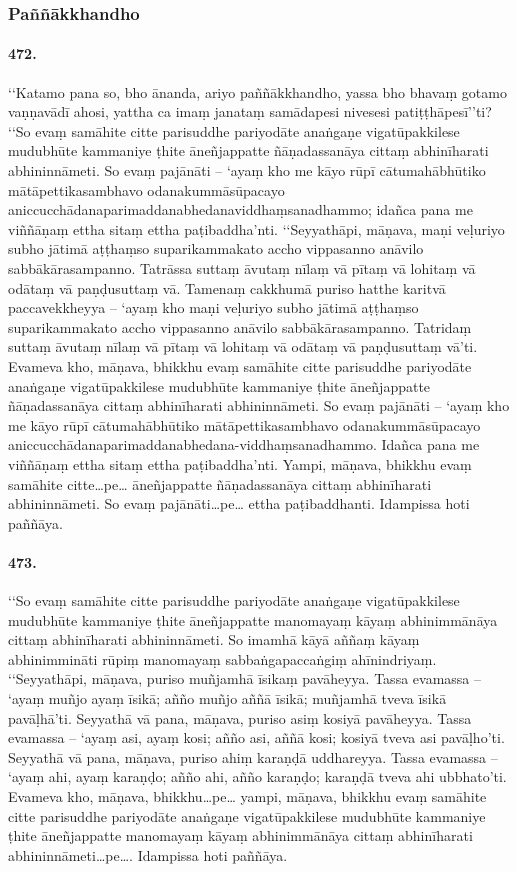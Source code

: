 \subsubsection{Paññākkhandho}

\paragraph{472.} ‘‘Katamo pana so, bho ānanda, ariyo paññākkhandho, yassa bho bhavaṃ gotamo vaṇṇavādī ahosi, yattha ca imaṃ janataṃ samādapesi nivesesi patiṭṭhāpesī’’ti? ‘‘So evaṃ samāhite citte parisuddhe pariyodāte anaṅgaṇe vigatūpakkilese mudubhūte kammaniye ṭhite āneñjappatte ñāṇadassanāya cittaṃ abhinīharati abhininnāmeti. So evaṃ pajānāti – ‘ayaṃ kho me kāyo rūpī cātumahābhūtiko mātāpettikasambhavo odanakummāsūpacayo aniccucchādanaparimaddanabhedanaviddhaṃsanadhammo; idañca pana me viññāṇaṃ ettha sitaṃ ettha paṭibaddha’nti. ‘‘Seyyathāpi, māṇava, maṇi veḷuriyo subho jātimā aṭṭhaṃso suparikammakato accho vippasanno anāvilo sabbākārasampanno. Tatrāssa suttaṃ āvutaṃ nīlaṃ vā pītaṃ vā lohitaṃ vā odātaṃ vā paṇḍusuttaṃ vā. Tamenaṃ cakkhumā puriso hatthe karitvā paccavekkheyya – ‘ayaṃ kho maṇi veḷuriyo subho jātimā aṭṭhaṃso suparikammakato accho vippasanno anāvilo sabbākārasampanno. Tatridaṃ suttaṃ āvutaṃ nīlaṃ vā pītaṃ vā lohitaṃ vā odātaṃ vā paṇḍusuttaṃ vā’ti. Evameva kho, māṇava, bhikkhu evaṃ samāhite citte parisuddhe pariyodāte anaṅgaṇe vigatūpakkilese mudubhūte kammaniye ṭhite āneñjappatte ñāṇadassanāya cittaṃ abhinīharati abhininnāmeti. So evaṃ pajānāti – ‘ayaṃ kho me kāyo rūpī cātumahābhūtiko mātāpettikasambhavo odanakummāsūpacayo aniccucchādanaparimaddanabhedana-viddhaṃsanadhammo. Idañca pana me viññāṇaṃ ettha sitaṃ ettha paṭibaddha’nti. Yampi, māṇava, bhikkhu evaṃ samāhite citte…pe… āneñjappatte ñāṇadassanāya cittaṃ abhinīharati abhininnāmeti. So evaṃ pajānāti…pe… ettha paṭibaddhanti. Idampissa hoti paññāya.

\paragraph{473.} ‘‘So evaṃ samāhite citte parisuddhe pariyodāte anaṅgaṇe vigatūpakkilese mudubhūte kammaniye ṭhite āneñjappatte manomayaṃ kāyaṃ abhinimmānāya cittaṃ abhinīharati abhininnāmeti. So imamhā kāyā aññaṃ kāyaṃ abhinimmināti rūpiṃ manomayaṃ sabbaṅgapaccaṅgiṃ ahīnindriyaṃ. ‘‘Seyyathāpi, māṇava, puriso muñjamhā īsikaṃ pavāheyya. Tassa evamassa – ‘ayaṃ muñjo ayaṃ īsikā; añño muñjo aññā īsikā; muñjamhā tveva īsikā pavāḷhā’ti. Seyyathā vā pana, māṇava, puriso asiṃ kosiyā pavāheyya. Tassa evamassa – ‘ayaṃ asi, ayaṃ kosi; añño asi, aññā kosi; kosiyā tveva asi pavāḷho’ti. Seyyathā vā pana, māṇava, puriso ahiṃ karaṇḍā uddhareyya. Tassa evamassa – ‘ayaṃ ahi, ayaṃ karaṇḍo; añño ahi, añño karaṇḍo; karaṇḍā tveva ahi ubbhato’ti. Evameva kho, māṇava, bhikkhu…pe… yampi, māṇava, bhikkhu evaṃ samāhite citte parisuddhe pariyodāte anaṅgaṇe vigatūpakkilese mudubhūte kammaniye ṭhite āneñjappatte manomayaṃ kāyaṃ abhinimmānāya cittaṃ abhinīharati abhininnāmeti…pe…. Idampissa hoti paññāya.

